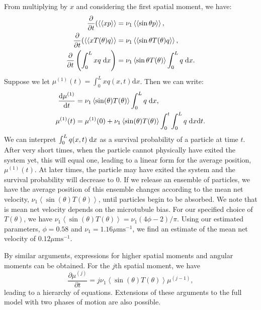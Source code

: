 \documentclass[twocolumn]{biophys}
\def\mean#1{\left< #1 \right>}
\begin{document}
From multiplying by $x$ and considering the first spatial moment, we have:
\begin{align*}
 \frac{\partial}{\partial t} ( \mean{\mean{x p}} & = \nu_1 \mean{\mean{\sin{\theta} p}}, \\
 \frac{\partial}{\partial t} ( \mean{\mean{x T(\theta) q}} & = \nu_1 \mean{\mean{\sin{\theta} T(\theta) q}}, \\
 \frac{\partial}{\partial t} \left( \int_0^L x q \hspace{1mm} \text{d} x \right) & = \nu_1 \mean{\sin{\theta} T(\theta) } \int_0^L q \hspace{1mm} \text{d} x.
 \end{align*}
Suppose we let $\mu^{(1)}(t) = \int_0^L x q(x,t) \text{d} x  $. Then we can write:
\begin{align}
 \frac{\text{d} \mu^{(1)}}{\text{d} t} &= \nu_1 \mean{\sin(\theta) T(\theta)} \int_0^L q \hspace{1mm} \text{d} x, \nonumber \\
 \mu^{(1)}(t) &= \mu^{(1)}(0) + \nu_1 \mean{\sin(\theta) T(\theta)} \int_0^t \int_0^L q \hspace{1mm} \text{d} x \text{d} t.
\end{align}
We can interpret $\int_0^L q(x,t) \hspace{1mm} \text{d} x$ as a survival probability of a particle at time $t$.
After very short times, when the particle cannot physically have exited the system yet, this will equal one, leading to a linear form for the average position, $\mu^{(1)}(t)$. 
At later times, the particle may have exited the system and the survival probability will decrease to 0.
If we release an ensemble of particles, we have the average position of this ensemble changes according to the mean net velocity, $\nu_1 \mean{\sin(\theta) T(\theta)}$, until particles begin to be absorbed.
We note that is mean net velocity depends on the microtubule bias. 
For our specified choice of $T(\theta)$, we have $\nu_1 \mean{\sin(\theta) T(\theta)} = \nu_1 (4 \phi -2)/\pi$.
Using our estimated parameters, $\phi=0.58$ and $\nu_1 = 1.16 \mu \text{ms}^{-1}$, we find an estimate of the mean net velocity of $0.12 \mu \text{ms}^{-1}$.

By similar arguments, expressions for higher spatial moments and angular moments can be obtained.
For the $j$th spatial moment, we have
\begin{equation}
 \frac{\partial \mu^{(j)}}{\partial t} = j \nu_1 \mean{\sin(\theta) T(\theta)} \mu^{(j-1)}, 
\end{equation}
leading to a hierarchy of equations.
Extensions of these arguments to the full model with two phases of motion are also possible. 
\end{document}
